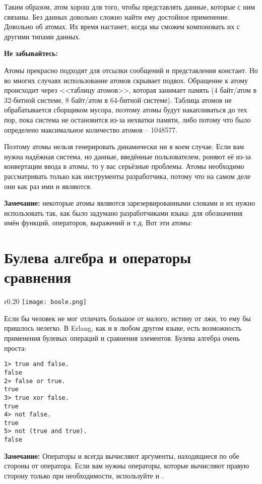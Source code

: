 Таким образом, атом хорош для того, чтобы представлять данные, которые с ним связаны. Без данных довольно сложно найти ему достойное применение. Довольно об атомах. Их время настанет, когда мы сможем компоновать их с другими типами данных.\\ 
\colorbox{lorange}
{
    \begin{minipage}{1.0\linewidth}
\textbf{Не забывайтесь:}

Атомы прекрасно подходят для отсылки сообщений и представления констант. Но во многих случаях использование атомов скрывает подвох. Обращение к атому происходит через <<таблицу атомов>>, которая занимает память (4 байт/атом в 32\--битной системе, 8 байт/атом в 64\--битной системе). Таблица атомов не обрабатывается сборщиком мусора, поэтому атомы будут накапливаться до тех пор, пока система не остановится из\--за нехватки памяти, либо потому что было определено максимальное количество атомов \--- 1048577.

Поэтому атомы нельзя генерировать динамически ни в коем случае. Если вам нужна надёжная система, но данные, введённые пользователем, роняют её из\--за конвертации ввода в атомы, то у вас серьёзные проблемы. Атомы необходимо рассматривать только как инструменты разработчика, потому что на самом деле они как раз ими и являются.
\end{minipage}
}
\colorbox{lgray}{
    \begin{minipage}{1.0\linewidth}
    \textbf{Замечание:} некоторые атомы являются зарезервированными словами и их нужно использовать так, как было задумано разработчиками языка: для обозначения имён функций, операторов, выражений и т.д. Вот эти атомы: 
\end{minipage}
}
\section{Булева алгебра и операторы сравнения}\label{boolandcompare}
\begin{wrapfigure}[7]{r}{0.20\linewidth}
    \texttt{[image: boole.png]}
\end{wrapfigure}
Если бы человек не мог отличать большое от малого, истину от лжи, то ему бы пришлось нелегко. В Erlang, как и в любом другом языке, есть возможность применения булевых операций и сравнения элементов.
Булева алгебра очень проста:\\ 
\begin{lstlisting}[style=repl]
1> true and false.
false
2> false or true.
true
3> true xor false.
true
4> not false.
true
5> not (true and true).
false
\end{lstlisting} 
\colorbox{lgray}
{
    \begin{minipage}{1.0\linewidth}
        \textbf{Замечание:} Операторы  и  всегда вычисляют аргументы, находящиеся по обе стороны от оператора. Если вам нужны операторы, которые вычисляют правую сторону только при необходимости, используйте  и .
    \end{minipage}
} 

